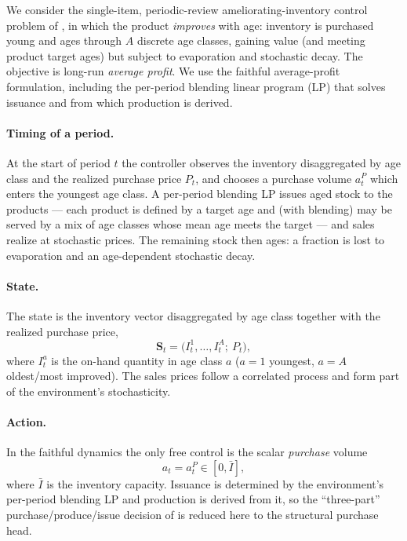 We consider the single-item, periodic-review ameliorating-inventory control problem of
\citet{pahrGrunow2025}, in which the product \emph{improves} with age: inventory is purchased young
and ages through $A$ discrete age classes, gaining value (and meeting product target ages) but subject
to evaporation and stochastic decay. The objective is long-run \emph{average profit}. We use the
faithful average-profit formulation, including the per-period blending linear program (LP) that solves
issuance and from which production is derived.

\paragraph{Timing of a period.}
At the start of period $t$ the controller observes the inventory disaggregated by age class and the
realized purchase price $P_t$, and chooses a purchase volume $a^P_t$ which enters the youngest age
class. A per-period blending LP issues aged stock to the products --- each product is defined by a
target age and (with blending) may be served by a mix of age classes whose mean age meets the target
--- and sales realize at stochastic prices. The remaining stock then ages: a fraction is lost to
evaporation and an age-dependent stochastic decay.

\paragraph{State.}
The state is the inventory vector disaggregated by age class together with the realized purchase
price,
\begin{equation*}
    \mathbf{S}_t=\bigl(I^{1}_t,\dots,I^{A}_t;\ P_t\bigr),
\end{equation*}
where $I^{a}_t$ is the on-hand quantity in age class $a$ ($a=1$ youngest, $a=A$ oldest/most improved).
The sales prices follow a correlated process and form part of the environment's stochasticity.

\paragraph{Action.}
In the faithful dynamics the only free control is the scalar \emph{purchase} volume
\begin{equation*}
    a_t=a^P_t\in[0,\bar I],
\end{equation*}
where $\bar I$ is the inventory capacity. Issuance is determined by the environment's per-period
blending LP and production is derived from it, so the ``three-part'' purchase/produce/issue decision
of \citet{pahrGrunow2025} is reduced here to the structural purchase head.

